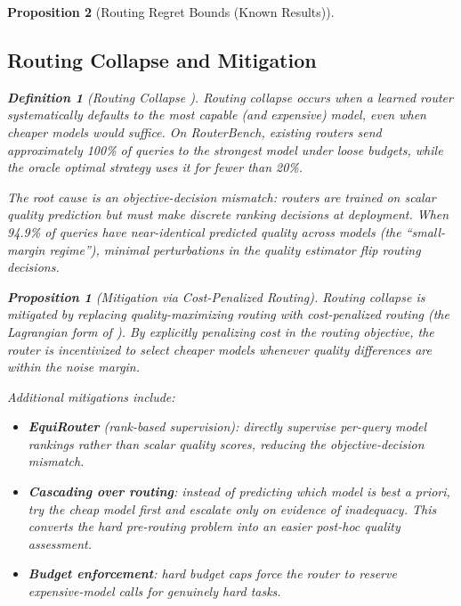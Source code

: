 \documentclass[11pt, a4paper, copyright]{googledeepmind}
\newtheorem{definition}{Definition}[section]
\newtheorem{proposition}{Proposition}[section]
\begin{document}
\begin{proposition}[Routing Regret Bounds (Known Results)]
\subsection{Routing Collapse and Mitigation}

\begin{definition}[Routing Collapse {\citep{routingcollapse2026}}]
\emph{Routing collapse} occurs when a learned router systematically defaults to the most capable (and expensive) model, even when cheaper models would suffice. On RouterBench, existing routers send approximately 100\% of queries to the strongest model under loose budgets, while the oracle optimal strategy uses it for fewer than 20\%.
\end{definition}

The root cause is an \emph{objective-decision mismatch}: routers are trained on scalar quality prediction but must make discrete ranking decisions at deployment. When 94.9\% of queries have near-identical predicted quality across models (the ``small-margin regime''), minimal perturbations in the quality estimator flip routing decisions.

\begin{proposition}[Mitigation via Cost-Penalized Routing]
Routing collapse is mitigated by replacing quality-maximizing routing with cost-penalized routing (the Lagrangian form of ). By explicitly penalizing cost in the routing objective, the router is incentivized to select cheaper models whenever quality differences are within the noise margin.
\end{proposition}

Additional mitigations include:
\begin{itemize}
\item \textbf{EquiRouter} (rank-based supervision): directly supervise per-query model rankings rather than scalar quality scores, reducing the objective-decision mismatch.
\item \textbf{Cascading over routing}: instead of predicting which model is best \emph{a priori}, try the cheap model first and escalate only on evidence of inadequacy. This converts the hard pre-routing problem into an easier post-hoc quality assessment.
\item \textbf{Budget enforcement}: hard budget caps force the router to reserve expensive-model calls for genuinely hard tasks.
\end{itemize}



\end{proposition}
\end{document}
